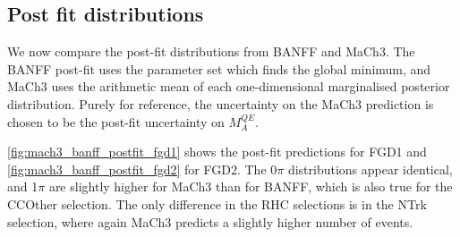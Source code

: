 \subsection{Post fit distributions}
We now compare the post-fit \pmu distributions from BANFF and MaCh3. The BANFF post-fit uses the parameter set which finds the global minimum, and MaCh3 uses the arithmetic mean of each one-dimensional marginalised posterior distribution. Purely for reference, the uncertainty on the MaCh3 prediction is chosen to be the post-fit uncertainty on $M_A^{QE}$.

\autoref{fig:mach3_banff_postfit_fgd1} shows the post-fit predictions for FGD1 and \autoref{fig:mach3_banff_postfit_fgd2} for FGD2. The 0$\pi$ distributions appear identical, and 1$\pi$ are slightly higher for MaCh3 than for BANFF, which is also true for the CCOther selection. The only difference in the RHC selections is in the NTrk selection, where again MaCh3 predicts a slightly higher number of events.

